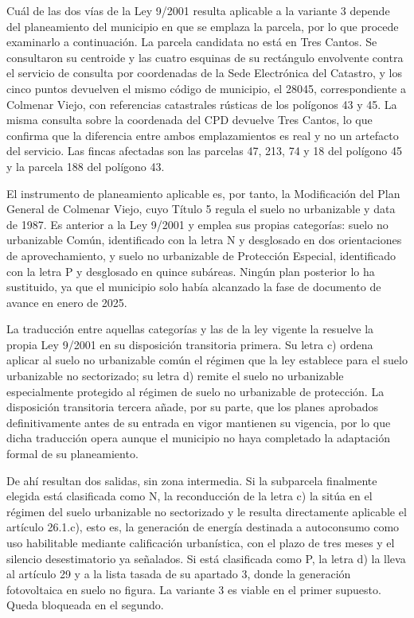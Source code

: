 Cuál de las dos vías de la Ley 9/2001 resulta aplicable a la variante 3 depende del planeamiento del municipio en que se emplaza la parcela, por lo que procede examinarlo a continuación. La parcela candidata no está en Tres Cantos. Se consultaron su centroide y las cuatro esquinas de su rectángulo envolvente contra el servicio de consulta por coordenadas de la Sede Electrónica del Catastro, y los cinco puntos devuelven el mismo código de municipio, el 28045, correspondiente a Colmenar Viejo, con referencias catastrales rústicas de los polígonos 43 y 45. La misma consulta sobre la coordenada del \ac{CPD} devuelve Tres Cantos, lo que confirma que la diferencia entre ambos emplazamientos es real y no un artefacto del servicio. Las fincas afectadas son las parcelas 47, 213, 74 y 18 del polígono 45 y la parcela 188 del polígono 43.

El instrumento de planeamiento aplicable es, por tanto, la Modificación del Plan General de Colmenar Viejo, cuyo Título 5 regula el suelo no urbanizable y data de 1987. Es anterior a la Ley 9/2001 y emplea sus propias categorías: suelo no urbanizable Común, identificado con la letra N y desglosado en dos orientaciones de aprovechamiento, y suelo no urbanizable de Protección Especial, identificado con la letra P y desglosado en quince subáreas. Ningún plan posterior lo ha sustituido, ya que el municipio solo había alcanzado la fase de documento de avance en enero de 2025.

La traducción entre aquellas categorías y las de la ley vigente la resuelve la propia Ley 9/2001 en su disposición transitoria primera. Su letra c) ordena aplicar al suelo no urbanizable común el régimen que la ley establece para el suelo urbanizable no sectorizado; su letra d) remite el suelo no urbanizable especialmente protegido al régimen de suelo no urbanizable de protección. La disposición transitoria tercera añade, por su parte, que los planes aprobados definitivamente antes de su entrada en vigor mantienen su vigencia, por lo que dicha traducción opera aunque el municipio no haya completado la adaptación formal de su planeamiento.

De ahí resultan dos salidas, sin zona intermedia. Si la subparcela finalmente elegida está clasificada como N, la reconducción de la letra c) la sitúa en el régimen del suelo urbanizable no sectorizado y le resulta directamente aplicable el artículo 26.1.c), esto es, la generación de energía destinada a autoconsumo como uso habilitable mediante calificación urbanística, con el plazo de tres meses y el silencio desestimatorio ya señalados. Si está clasificada como P, la letra d) la lleva al artículo 29 y a la lista tasada de su apartado 3, donde la generación fotovoltaica en suelo no figura. La variante 3 es viable en el primer supuesto. Queda bloqueada en el segundo.

